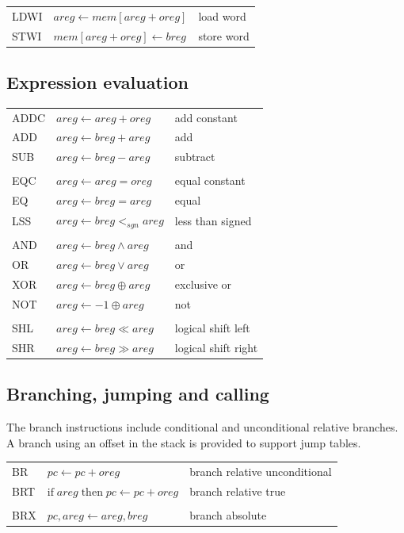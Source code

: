 \documentclass[a4paper, 12pt]{article}
\begin{document}
\begin{tabular}{lll}
LDWI  & $areg \leftarrow mem[areg + oreg]$& load word  \\
STWI  & $mem[areg + oreg] \leftarrow breg$& store word   
\end{tabular}


\subsection*{Expression evaluation}

\begin{tabular}{lll}
ADDC & $ areg \leftarrow areg + oreg $ & add constant\\  
ADD & $ areg \leftarrow breg + areg $ & add \\  
SUB & $ areg  \leftarrow breg - areg $ & subtract \\  
&&\\
EQC & $ areg \leftarrow areg = oreg $ & equal constant \\  
EQ & $ areg \leftarrow breg = areg  $ & equal \\  
LSS & $ areg  \leftarrow breg  <_{sgn} areg $ & less than signed \\  
&&\\
AND & $ areg \leftarrow breg \wedge areg $ & and \\  
OR  & $ areg \leftarrow breg  \vee areg $ & or \\  
XOR & $ areg \leftarrow breg \oplus areg $& exclusive or \\
NOT & $ areg  \leftarrow -1 \oplus areg $& not\\
&&\\
SHL & $ areg \leftarrow breg \ll areg $ & logical shift left \\  
SHR & $ areg \leftarrow breg \gg areg $ & logical shift right  \\  
\end{tabular}


\subsection*{Branching, jumping and calling}

The branch instructions include conditional and unconditional relative 
branches. A branch using an offset in the stack is provided to 
support jump tables.

\begin{tabular}{lll}
BR   & $ pc \leftarrow pc + oreg $& branch relative unconditional \\
BRT & $\mathrm{if}\; areg \;\mathrm{then}\; pc \leftarrow pc + oreg $ &branch relative true\\
&&\\
BRX & $pc, areg \leftarrow areg, breg$ &branch absolute\\
\end{tabular}
\end{document}
